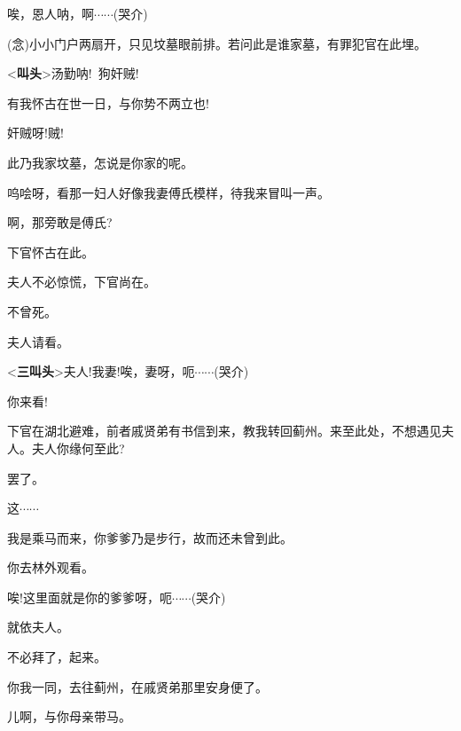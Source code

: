 {{唉，恩人呐，啊$\cdots{}\cdots{}$({\hwfs 哭介})}



{({\akai 念})小小门户两扇开，只见坟墓眼前排。若问此是谁家墓，有罪犯官在此埋。}

{\textless{}{\!\bfseries\akai 叫头}\!\textgreater{}汤勤{\footnotesize 呐}!~狗奸贼!}

{有我怀古在世一日，与你势不两立也!}


{奸贼呀!贼!}


{此乃我家坟墓，怎说是你家的呢。}

{呜哙呀，看那一妇人好像我妻傅氏模样，待我来冒叫一声。}

{啊，那旁敢是傅氏?}

{下官怀古在此。}

{夫人不必惊慌，下官尚在。}

{不曾死。}

{夫人请看。}

{\textless{}{\!\bfseries\akai 三叫头}\!\textgreater{}夫人!我妻!唉，妻呀，呃$\cdots{}\cdots{}$({\hwfs 哭介})}




{你来看!}


{下官在湖北避难，前者戚贤弟有书信到来，教我转回蓟州。来至此处，不想遇见夫人。夫人你缘何至此?}

{罢了。}

{这$\cdots{}\cdots{}$}

{我是乘马而来，你爹爹乃是步行，故而还未曾到此。}

{你去林外观看。}

{唉!这里面就是你的爹爹呀，呃$\cdots{}\cdots{}$({\hwfs 哭介})}

{就依夫人。}

{不必拜了，起来。}

{你我一同，去往蓟州，在戚贤弟那里安身便了。}

{儿啊，与你母亲带马。}


}
